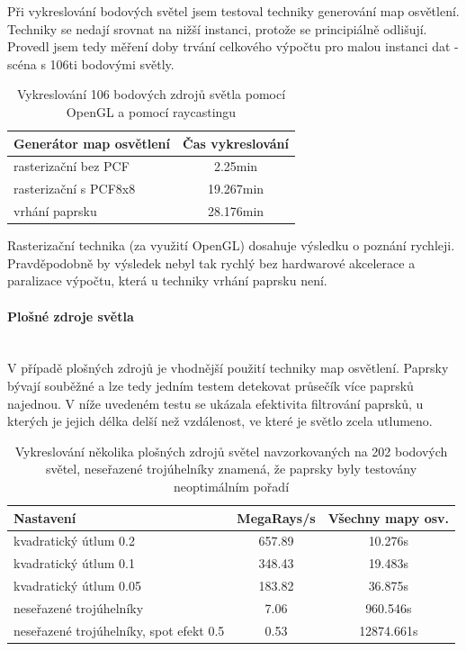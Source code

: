 \documentclass[11pt,twoside,a4paper]{book}
\begin{document}
Při vykreslování bodových světel jsem testoval techniky generování map osvětlení. Techniky se nedají srovnat na nižší instanci, protože se principiálně odlišují. Provedl jsem tedy měření doby trvání celkového výpočtu pro malou instanci dat - scéna s 106ti bodovými světly.
\begin{table}[h!]
\begin{center}
\begin{tabular}{|p{50mm}|c|}
\hline
\textbf{Generátor map osvětlení} & \textbf{Čas vykreslování} \\
\hline
rasterizační bez PCF & 2.25min\\ \hline
rasterizační s PCF8x8 & 19.267min\\ \hline
vrhání paprsku & 28.176min\\ \hline
\end{tabular}
\caption{Vykreslování 106 bodových zdrojů světla pomocí OpenGL a pomocí raycastingu}
\end{center}
\end{table}

Rasterizační technika (za využití OpenGL) dosahuje výsledku o poznání rychleji. Pravděpodobně by výsledek nebyl tak rychlý bez hardwarové akcelerace a paralizace výpočtu, která u techniky vrhání paprsku není.

\paragraph{Plošné zdroje světla}\ \ \\

V případě plošných zdrojů je vhodnější použití techniky map osvětlení. Paprsky bývají souběžné a lze tedy jedním testem detekovat průsečík více paprsků najednou. V níže uvedeném testu se ukázala efektivita filtrování paprsků, u kterých je jejich délka delší než vzdálenost, ve které je světlo zcela utlumeno.
\begin{table}[h!]
\begin{center}
\begin{tabular}{|p{80mm}|c|c|}
\hline
\textbf{Nastavení} & \textbf{MegaRays/s} & \textbf{Všechny mapy osv.} \\
\hline
kvadratický útlum 0.2 & 657.89 & 10.276s\\ \hline
kvadratický útlum 0.1 & 348.43 & 19.483s\\ \hline
kvadratický útlum 0.05 & 183.82 & 36.875s\\ \hline
neseřazené trojúhelníky & 7.06 & 960.546s\\ \hline
neseřazené trojúhelníky, spot efekt 0.5 & 0.53 & 12874.661s\\ \hline
\end{tabular}
\caption{Vykreslování několika plošných zdrojů světel navzorkovaných na 202 bodových světel, neseřazené trojúhelníky znamená, že paprsky byly testovány neoptimálním pořadí }
\end{center}
\end{table}
\newpage
\end{document}
